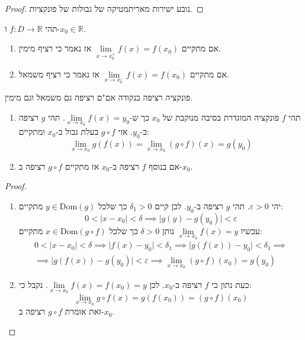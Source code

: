 \documentclass{tstextbook}
\begin{document}
\begin{proof}
נובע ישירות מאריתמטיקה של גבולות של פונקציות.

\end{proof}
\begin{definition}
תהי \(f:D\to \mathbb{R}\) ו-\(x_{0} \in \mathbb{R}\).

  \begin{enumerate}
    \item אם מתקיים \(\underset{ x \to x_{0}^{+} }{\lim }f(x)=f(x_{0})\) אז נאמר כי רציף מימין. 


    \item אם מתקיים \(\underset{ x \to x_{0}^{-} }{\lim }f(x)=f(x_{0})\) אז נאמר כי רציף משמאל. 


  \end{enumerate}
\end{definition}
\begin{proposition}
פונקציה רציפה בנקודה אם"ם רציפה גם משמאל וגם מימין.

\end{proposition}
\begin{theorem}
  \begin{enumerate}
    \item תהי \(f\) פונקציה המוגדרת בסיבה מנוקבת של \(x_{0}\) כך ש-\(\underset{ x \to x_{0} }{\lim }f(x)=y_{0}\). תהי \(g\) רציפה ב-\(y_{0}\). אזי \(g\circ f\) בעלת גבול ב-\(x_{0}\) ומתקיים: 
$$\lim_{ x \to x_{0} } g(f(x))=\lim_{ x \to x_{0} } \left( g \circ  f \right)(x)=g(y_{0})$$


    \item אם בנוסף \(f\)  רציפה ב-\(x_{0}\) אז מתקיים \(g \circ f\) רציפה ב-\(x_{0}\). 


  \end{enumerate}
\end{theorem}
\begin{proof}
  \begin{enumerate}
    \item יהי \(\varepsilon>0\). תהי \(g\) רציפה ב-\(y_{0}\). לכן קיים \(\delta_{1}>0\) כך שלכל \(y \in \mathrm{Dom}(g)\) מתקיים: 
$$0<\lvert x-x_{0} \rvert <\delta\implies \lvert g(y)-g(y_{0}) \rvert <\varepsilon$$
עכשיו \(\underset{ x \to x_{0} }{\lim }f(x)=y\) נותן \(\delta>0\) כך שלכל \(x \in \mathrm{Dom}\left( g \circ f \right)\) מתקיים:
\begin{gather*}0<\lvert x-x_{0} \rvert <\delta\implies \lvert f(x)-y_{0} \rvert <\delta_{1}\implies \lvert g(f(x))-y_{0} \rvert <\delta_{1} \implies \\\implies \lvert g(f(x))-g(y_{0}) \rvert <\varepsilon \implies \lim_{ x \to x_{0} } \left( g\circ f \right)(x_{0})=g(y_{0})
\end{gather*}


    \item כעת נתון כי \(f\) רציפה ב-\(x_{0}\). לכן \(\underset{ x \to x_{0} }{\lim }f(x)=f(x_{0})=y\). נקבל כי: 
$$\lim_{ x \to x_{0} } g \circ f(x)=g(f(x_{0}))=\left( g\circ f \right)(x_{0})$$
זאת אומרת \(g\circ f\) רציפה ב-\(x_{0}\).


  \end{enumerate}
\end{proof}
\end{document}
